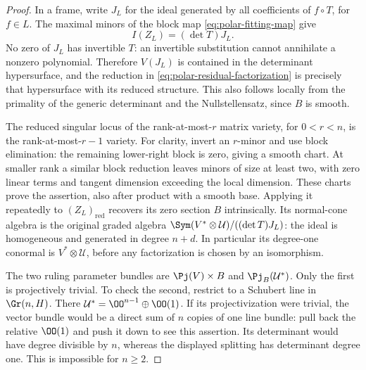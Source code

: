 \begin{proof}
In a frame, write \(J_L\) for the ideal generated by all
coefficients of \(f\circ T\), for \(f\in L\).  The maximal
minors of the block map \eqref{eq:polar-fitting-map} give
\begin{equation}\label{eq:polar-residual-factorization}
                 I(Z_L)=(\det T)J_L.
\end{equation}
No zero of \(J_L\) has invertible \(T\): an invertible
substitution cannot annihilate a nonzero polynomial.  Therefore
\(V(J_L)\) is contained in the determinant hypersurface, and the
reduction in \eqref{eq:polar-residual-factorization} is precisely
that hypersurface with its reduced structure.  This also follows
locally from the primality of the generic determinant and the
Nullstellensatz, since \(B\) is smooth.

The reduced singular locus of the rank-at-most-\(r\) matrix
variety, for \(0<r<n\), is the rank-at-most-\(r-1\) variety.
For clarity, invert an \(r\)-minor and use block elimination:
the remaining lower-right block is zero, giving a smooth chart.
At smaller rank a similar block reduction leaves minors of size
at least two, with zero linear terms and tangent dimension exceeding
the local dimension.  These charts prove the assertion, also after
product with a smooth base.  Applying it repeatedly to
\((Z_L)_{\mathrm{red}}\) recovers its zero section \(B\)
intrinsically.  Its normal-cone algebra is the original graded algebra
\(\Sym(V^*\otimes\mathcal U)/((\det T)J_L)\): the ideal is
homogeneous and generated in degree \(n+d\).  In particular its
degree-one conormal is \(V^*\otimes\mathcal U\), before any
factorization is chosen by an isomorphism.

The two ruling parameter bundles are \(\Pj(V)\times B\) and
\(\Pj_B(\mathcal U^*)\).  Only the first is projectively trivial.
To check the second, restrict to a Schubert line in \(\Gr(n,H)\).
There \(\mathcal U^*=\OO^{n-1}\oplus\OO(1)\).  If its
projectivization were trivial, the vector bundle would be a direct
sum of \(n\) copies of one line bundle: pull back the relative
\(\OO(1)\) and push it down to see this assertion.  Its determinant
would have degree divisible by \(n\), whereas the displayed
splitting has determinant degree one.  This is impossible for
\(n\ge2\).


\end{proof}
